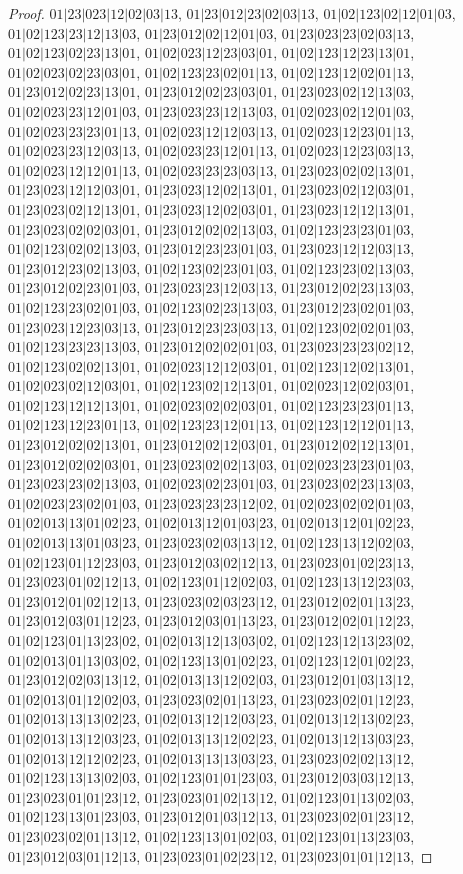 \documentclass[12pt]{article}
\theoremstyle{plain}
\theoremstyle{definition}
\theoremstyle{remark}
\begin{document}
\begin{proof}
$01|23|023|12|02|03|13$, $01|23|012|23|02|03|13$, $01|02|123|02|12|01|03$, $01|02|123|23|12|13|03$, $01|23|012|02|12|01|03$, $01|23|023|23|02|03|13$, $01|02|123|02|23|13|01$, $01|02|023|12|23|03|01$, $01|02|123|12|23|13|01$, $01|02|023|02|23|03|01$, $01|02|123|23|02|01|13$, $01|02|123|12|02|01|13$, $01|23|012|02|23|13|01$, $01|23|012|02|23|03|01$, $01|23|023|02|12|13|03$, $01|02|023|23|12|01|03$, $01|23|023|23|12|13|03$, $01|02|023|02|12|01|03$, $01|02|023|23|23|01|13$, $01|02|023|12|12|03|13$, $01|02|023|12|23|01|13$, $01|02|023|23|12|03|13$, $01|02|023|23|12|01|13$, $01|02|023|12|23|03|13$, $01|02|023|12|12|01|13$, $01|02|023|23|23|03|13$, $01|23|023|02|02|13|01$, $01|23|023|12|12|03|01$, $01|23|023|12|02|13|01$, $01|23|023|02|12|03|01$, $01|23|023|02|12|13|01$, $01|23|023|12|02|03|01$, $01|23|023|12|12|13|01$, $01|23|023|02|02|03|01$, $01|23|012|02|02|13|03$, $01|02|123|23|23|01|03$, $01|02|123|02|02|13|03$, $01|23|012|23|23|01|03$, $01|23|023|12|12|03|13$, $01|23|012|23|02|13|03$, $01|02|123|02|23|01|03$, $01|02|123|23|02|13|03$, $01|23|012|02|23|01|03$, $01|23|023|23|12|03|13$, $01|23|012|02|23|13|03$, $01|02|123|23|02|01|03$, $01|02|123|02|23|13|03$, $01|23|012|23|02|01|03$, $01|23|023|12|23|03|13$, $01|23|012|23|23|03|13$, $01|02|123|02|02|01|03$, $01|02|123|23|23|13|03$, $01|23|012|02|02|01|03$, $01|23|023|23|23|02|12$, $01|02|123|02|02|13|01$, $01|02|023|12|12|03|01$, $01|02|123|12|02|13|01$, $01|02|023|02|12|03|01$, $01|02|123|02|12|13|01$, $01|02|023|12|02|03|01$, $01|02|123|12|12|13|01$, $01|02|023|02|02|03|01$, $01|02|123|23|23|01|13$, $01|02|123|12|23|01|13$, $01|02|123|23|12|01|13$, $01|02|123|12|12|01|13$, $01|23|012|02|02|13|01$, $01|23|012|02|12|03|01$, $01|23|012|02|12|13|01$, $01|23|012|02|02|03|01$, $01|23|023|02|02|13|03$, $01|02|023|23|23|01|03$, $01|23|023|23|02|13|03$, $01|02|023|02|23|01|03$, $01|23|023|02|23|13|03$, $01|02|023|23|02|01|03$, $01|23|023|23|23|12|02$, $01|02|023|02|02|01|03$, $01|02|013|13|01|02|23$, $01|02|013|12|01|03|23$, $01|02|013|12|01|02|23$, $01|02|013|13|01|03|23$, $01|23|023|02|03|13|12$, $01|02|123|13|12|02|03$, $01|02|123|01|12|23|03$, $01|23|012|03|02|12|13$, $01|23|023|01|02|23|13$, $01|23|023|01|02|12|13$, $01|02|123|01|12|02|03$, $01|02|123|13|12|23|03$, $01|23|012|01|02|12|13$, $01|23|023|02|03|23|12$, $01|23|012|02|01|13|23$, $01|23|012|03|01|12|23$, $01|23|012|03|01|13|23$, $01|23|012|02|01|12|23$, $01|02|123|01|13|23|02$, $01|02|013|12|13|03|02$, $01|02|123|12|13|23|02$, $01|02|013|01|13|03|02$, $01|02|123|13|01|02|23$, $01|02|123|12|01|02|23$, $01|23|012|02|03|13|12$, $01|02|013|13|12|02|03$, $01|23|012|01|03|13|12$, $01|02|013|01|12|02|03$, $01|23|023|02|01|13|23$, $01|23|023|02|01|12|23$, $01|02|013|13|13|02|23$, $01|02|013|12|12|03|23$, $01|02|013|12|13|02|23$, $01|02|013|13|12|03|23$, $01|02|013|13|12|02|23$, $01|02|013|12|13|03|23$, $01|02|013|12|12|02|23$, $01|02|013|13|13|03|23$, $01|23|023|02|02|13|12$, $01|02|123|13|13|02|03$, $01|02|123|01|01|23|03$, $01|23|012|03|03|12|13$, $01|23|023|01|01|23|12$, $01|23|023|01|02|13|12$, $01|02|123|01|13|02|03$, $01|02|123|13|01|23|03$, $01|23|012|01|03|12|13$, $01|23|023|02|01|23|12$, $01|23|023|02|01|13|12$, $01|02|123|13|01|02|03$, $01|02|123|01|13|23|03$, $01|23|012|03|01|12|13$, $01|23|023|01|02|23|12$, $01|23|023|01|01|12|13$, 
\end{proof}
\end{document}
